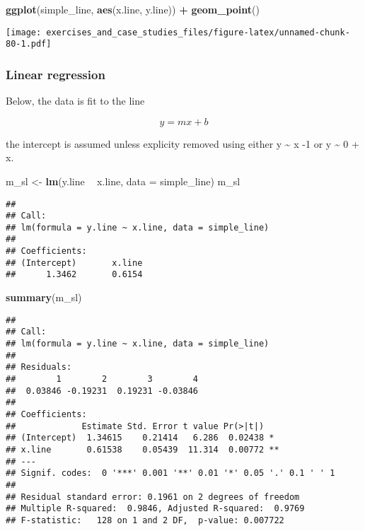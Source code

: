 \documentclass[]{book}
\newenvironment{Shaded}{\begin{snugshade}}{\end{snugshade}}
\newcommand{\DataTypeTok}[1]{\textcolor[rgb]{0.13,0.29,0.53}{#1}}
\newcommand{\KeywordTok}[1]{\textcolor[rgb]{0.13,0.29,0.53}{\textbf{#1}}}
\newcommand{\NormalTok}[1]{#1}
\newcommand{\OperatorTok}[1]{\textcolor[rgb]{0.81,0.36,0.00}{\textbf{#1}}}
\newcommand{\StringTok}[1]{\textcolor[rgb]{0.31,0.60,0.02}{#1}}
\theoremstyle{definition}
\theoremstyle{definition}
\theoremstyle{definition}
\theoremstyle{remark}
\begin{document}
\begin{Shaded}
\begin{Highlighting}[]
\KeywordTok{ggplot}\NormalTok{(simple_line, }\KeywordTok{aes}\NormalTok{(x.line, y.line)) }\OperatorTok{+}
\StringTok{  }\KeywordTok{geom_point}\NormalTok{()}
\end{Highlighting}
\end{Shaded}

\texttt{[image: exercises\_and\_case\_studies\_files/figure-latex/unnamed-chunk-80-1.pdf]}

\hypertarget{linear-regression}{%
\subsubsection{Linear regression}\label{linear-regression}}

Below, the data is fit to the line

\[
y = mx + b
\]

the intercept is assumed unless explicity removed using either y
\textasciitilde{} x -1 or y \textasciitilde{} 0 + x.

\begin{Shaded}
\begin{Highlighting}[]
\NormalTok{m_sl <-}\StringTok{ }\KeywordTok{lm}\NormalTok{(y.line }\OperatorTok{~}\StringTok{ }\NormalTok{x.line, }
          \DataTypeTok{data =}\NormalTok{ simple_line)}
\NormalTok{m_sl}
\end{Highlighting}
\end{Shaded}

\begin{verbatim}
## 
## Call:
## lm(formula = y.line ~ x.line, data = simple_line)
## 
## Coefficients:
## (Intercept)       x.line  
##      1.3462       0.6154
\end{verbatim}

\begin{Shaded}
\begin{Highlighting}[]
\KeywordTok{summary}\NormalTok{(m_sl)}
\end{Highlighting}
\end{Shaded}

\begin{verbatim}
## 
## Call:
## lm(formula = y.line ~ x.line, data = simple_line)
## 
## Residuals:
##        1        2        3        4 
##  0.03846 -0.19231  0.19231 -0.03846 
## 
## Coefficients:
##             Estimate Std. Error t value Pr(>|t|)   
## (Intercept)  1.34615    0.21414   6.286  0.02438 * 
## x.line       0.61538    0.05439  11.314  0.00772 **
## ---
## Signif. codes:  0 '***' 0.001 '**' 0.01 '*' 0.05 '.' 0.1 ' ' 1
## 
## Residual standard error: 0.1961 on 2 degrees of freedom
## Multiple R-squared:  0.9846, Adjusted R-squared:  0.9769 
## F-statistic:   128 on 1 and 2 DF,  p-value: 0.007722
\end{verbatim}
\end{document}
